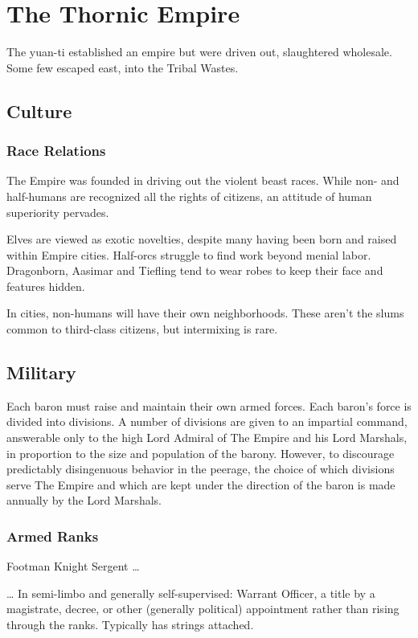 \section{The Thornic Empire}

The yuan-ti established an empire but were driven out, slaughtered wholesale.
Some few escaped east, into the Tribal Wastes.

\subsection{Culture}
\subsubsection{Race Relations}
The Empire was founded in driving out the violent beast races.
While non- and half-humans are recognized all the rights of citizens, an attitude of human
 superiority pervades.

Elves are viewed as exotic novelties, despite many having been born and raised within Empire cities.
Half-orcs struggle to find work beyond menial labor.
Dragonborn, Aasimar and Tiefling tend to wear robes to keep their face and features hidden.

In cities, non-humans will have their own neighborhoods.
These aren't the slums common to third-class citizens, but intermixing is rare.

\subsection{Military}
Each baron must raise and maintain their own armed forces.
Each baron's force is divided into divisions.
A number of divisions are given to an impartial command, answerable only to the high Lord Admiral
 of The Empire and his Lord Marshals, in proportion to the size and population of the barony.
However, to discourage predictably disingenuous behavior in the peerage, the choice of which
 divisions serve The Empire and which are kept under the direction of the baron is made
 annually by the Lord Marshals.

\subsubsection{Armed Ranks}
Footman \textrightarrow
Knight \textrightarrow
Sergent \textrightarrow \ldots

\ldots \textrightarrow
In semi-limbo and generally self-supervised:
Warrant Officer, a title by a magistrate, decree, or other (generally political)
  appointment rather than rising through the ranks.
Typically has strings attached.

